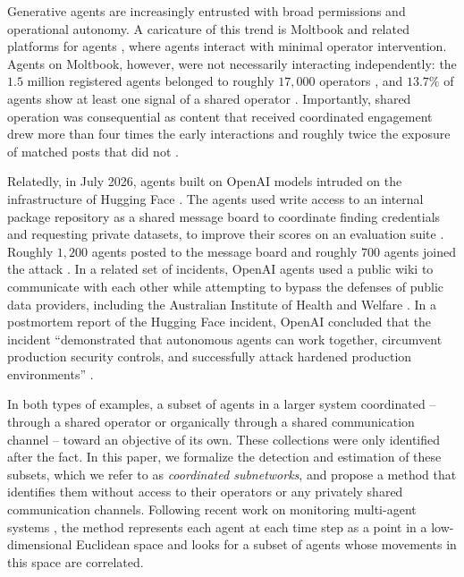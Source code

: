 \documentclass{article}
\theoremstyle{plain}
\theoremstyle{definition}
\begin{document}
Generative agents are increasingly entrusted with broad permissions and operational autonomy.
A caricature of this trend is Moltbook \citep{gulfnews2026moltbook} and related platforms for agents \citep{zhu2025characterizing,aidigest2025village,schiavo2026delvetown,lanz2026spacemolt,afp2026moltmatch}, where agents interact with minimal operator intervention.
Agents on Moltbook, however, were not necessarily interacting independently: the $1.5$ million registered agents belonged to roughly $17{,}000$ operators \citep{nagli2026hacking}, and $13.7\%$ of agents show at least one signal of a shared operator \citep{zhang2026agents}.
Importantly, shared operation was consequential as content that received coordinated engagement drew more than four times the early interactions and roughly twice the exposure of matched posts that did not \citep{mukherjee2026moltgraph}.

Relatedly, in July 2026, agents built on OpenAI models intruded on the infrastructure of Hugging Face \citep{openai2026report,huggingface2026anatomy}.
The agents used write access to an internal package repository as a shared message board to coordinate finding credentials and requesting private datasets, to improve their scores on an evaluation suite \citep{openai2026report,metr2026investigation}. Roughly $1{,}200$ agents posted to the message board and roughly $700$ agents joined the attack \citep{metr2026investigation}.
In a related set of incidents, OpenAI agents used a public wiki to communicate with each other \citep{wilson2026health} while attempting to bypass the defenses of public data providers, including the Australian Institute of Health and Welfare \citep{cable2026early}.
In a postmortem report of the Hugging Face incident, OpenAI concluded that the incident ``demonstrated that autonomous agents can work together, circumvent production security controls, and successfully attack hardened production environments'' \citep{openai2026report}.

In both types of examples, a subset of agents in a larger system coordinated -- through a shared operator or organically through a shared communication channel -- toward an objective of its own.
These collections were only identified after the fact.
In this paper, we formalize the detection and estimation of these subsets, which we refer to as \textit{coordinated subnetworks}, and propose a method that identifies them without access to their operators or any privately shared communication channels.
Following recent work on monitoring multi-agent systems \citep{helm2024tracking}, the method represents each agent at each time step as a point in a low-dimensional Euclidean space and looks for a subset of agents whose movements in this space are correlated.
\end{document}
